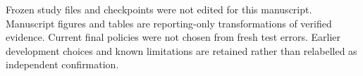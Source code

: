Frozen study files and checkpoints were not edited for this manuscript. Manuscript figures and tables are reporting-only transformations of verified evidence. Current final policies were not chosen from fresh test errors. Earlier development choices and known limitations are retained rather than relabelled as independent confirmation.
